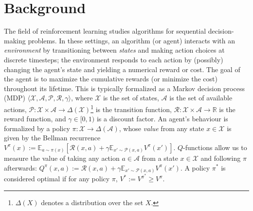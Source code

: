 \section{Background}
\label{sec:brackground}


The field of reinforcement learning studies algorithms for sequential decision-making problems. In these settings, an algorithm (or agent) interacts with an {\em environment} by transitioning between {\em states} and making action choices at discrete timesteps; the environment responds to each action by (possibly) changing the agent's state and yielding a numerical reward or cost. The goal of the agent is to maximize the cumulative rewards (or minimize the cost) throughout its lifetime.
This is typically formalized as a Markov decision process (MDP) \citep{puterman2014markov} $\langle \mathcal{X}, \mathcal{A}, \mathcal{P}, \mathcal{R}, \gamma \rangle$, where $\mathcal{X}$ is the set of states, $\mathcal{A}$ is the set of available actions, $\mathcal{P}:\mathcal{X}\times\mathcal{A}\rightarrow \Delta(\mathcal{X})$\footnote{$\Delta(X)$ denotes a distribution over the set $X$.} is the transition function, $\mathcal{R}:\mathcal{X}\times\mathcal{A}\rightarrow\mathbb{R}$ is the reward function, and $\gamma\in [0, 1)$ is a discount factor. An agent's behaviour is formalized by a policy $\pi:\mathcal{X}\rightarrow\Delta(\mathcal{A})$, whose {\em value} from any state $x\in\mathcal{X}$ is given by the Bellman recurrence 
$V^{\pi}(x) := \mathbb{E}_{a\sim\pi(x)}\left[\mathcal{R}(x, a) + \gamma \mathbb{E}_{x'\sim\mathcal{P}(x, a)}V^{\pi}(x')\right]$. $Q$-functions allow us to measure the value of taking any action $a\in\mathcal{A}$ from a state $x\in\mathcal{X}$ and following $\pi$ afterwards: $Q^{\pi}(x, a) := \mathcal{R}(x, a) + \gamma \mathbb{E}_{x'\sim\mathcal{P}(x, a)} V^{\pi}(x')$. %
A policy $\pi^*$ is considered optimal if for any policy $\pi$, $V^* := V^{\pi^*} \geq V^{\pi}$.

